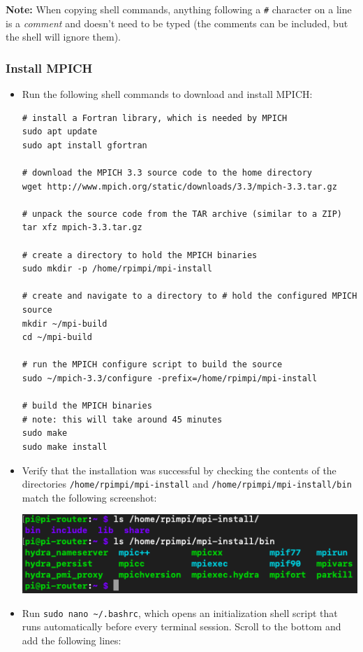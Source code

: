 \documentclass{article}
\newcommand{\tttilde}[0]{\textasciitilde{}}
\begin{document}
\textbf{Note:} When copying shell commands, anything following a \texttt{\#} character on a line is a \emph{comment} and doesn't need to be typed (the comments can be included, but the shell will ignore them).

\subsubsection{Install MPICH}
\begin{itemize}
    \item Run the following shell commands to download and install MPICH:
\begin{verbatim}
# install a Fortran library, which is needed by MPICH
sudo apt update
sudo apt install gfortran

# download the MPICH 3.3 source code to the home directory
wget http://www.mpich.org/static/downloads/3.3/mpich-3.3.tar.gz

# unpack the source code from the TAR archive (similar to a ZIP)
tar xfz mpich-3.3.tar.gz    

# create a directory to hold the MPICH binaries
sudo mkdir -p /home/rpimpi/mpi-install

# create and navigate to a directory to # hold the configured MPICH source
mkdir ~/mpi-build
cd ~/mpi-build

# run the MPICH configure script to build the source
sudo ~/mpich-3.3/configure -prefix=/home/rpimpi/mpi-install

# build the MPICH binaries
# note: this will take around 45 minutes
sudo make
sudo make install    
\end{verbatim}

    \item Verify that the installation was successful by checking the contents of the directories \texttt{/home/rpimpi/mpi-install} and \texttt{/home/rpimpi/mpi-install/bin} match the following screenshot:
    
    \includegraphics[width=\textwidth]{images/mpi-after-install.png}

    \item Run \texttt{sudo nano \tttilde/.bashrc}, which opens an initialization shell script that runs automatically before every terminal session. Scroll to the bottom and add the following lines:
    

\end{itemize}
\end{document}
